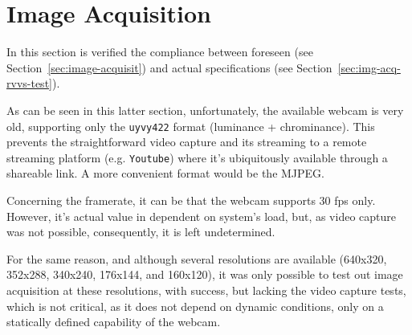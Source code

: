 \section{Image Acquisition}%
\label{sec:img-acq-verif}
In this section is verified the compliance between foreseen (see
Section~\ref{sec:image-acquisit}) and actual specifications (see
Section~\ref{sec:img-acq-rvvs-test}).

As can be seen in this latter section, unfortunately, the available webcam is
very old, supporting only the \texttt{uyvy422} format (luminance +
chrominance). This prevents the straightforward video capture and its streaming
to a remote streaming platform (e.g. \texttt{Youtube}) where it's ubiquitously
available through a shareable link. A more convenient format would be the
MJPEG.

Concerning the framerate, it can be that the webcam supports 30 fps
only. However, it's actual value in dependent on system's load, but, as video
capture was not possible, consequently, it is left undetermined.

For the same reason, and although several resolutions are available (640x320,
352x288, 340x240, 176x144, and 160x120), it was only possible to test out image
acquisition at these resolutions, with success, but lacking the video capture
tests, which is not critical, as it does not depend on dynamic conditions, only
on a statically defined capability of the webcam.

